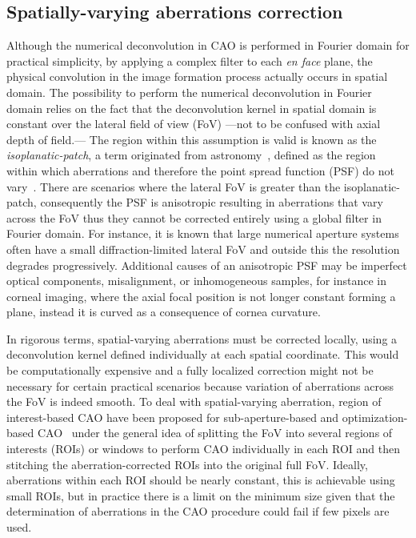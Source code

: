 \subsection{Spatially-varying aberrations correction}

Although the numerical deconvolution in CAO is performed in Fourier domain for practical simplicity, by applying a complex filter to each \textit{en face} plane, the physical convolution in the image formation process actually occurs in spatial domain. The possibility to perform the numerical deconvolution in Fourier domain relies on the fact that the deconvolution kernel in spatial domain is constant over the lateral field of view (FoV) ---not to be confused with axial depth of field.--- The region within this assumption is valid is known as the \textit{isoplanatic-patch}, a term originated from astronomy~\cite{Beckers1993_Adaptive}, defined as the region within which aberrations and therefore the point spread function (PSF) do not vary~\cite{Kumar2015_Anisotropic}. There are scenarios where the lateral FoV is greater than the isoplanatic-patch, consequently the PSF is anisotropic resulting in aberrations that vary across the FoV thus they cannot be corrected entirely using a global filter in Fourier domain.  For instance, it is known that large numerical aperture systems often have a small diffraction-limited lateral FoV and outside this the resolution degrades progressively. Additional causes of an anisotropic PSF may be imperfect optical components, misalignment, or inhomogeneous samples, for instance in corneal imaging, where the axial focal position is not longer constant forming a plane, instead it is curved as a consequence of cornea curvature.

In rigorous terms, spatial-varying aberrations must be corrected locally, using a deconvolution kernel defined individually at each spatial coordinate. This would be computationally expensive and a fully localized correction might not be necessary for certain practical scenarios because variation of aberrations across the FoV is indeed smooth. To deal with spatial-varying aberration, region of interest-based CAO have been proposed for sub-aperture-based and optimization-based CAO~\cite{Kumar2015_Anisotropic, South2019_Local} under the general idea of splitting the FoV into several regions of interests (ROIs) or windows to perform CAO individually in each ROI and then stitching the aberration-corrected ROIs into the original full FoV. Ideally, aberrations within each ROI should be nearly constant, this is achievable using small ROIs, but in practice there is a limit on the minimum size given that the determination of aberrations in the CAO procedure could fail if few pixels are used.

